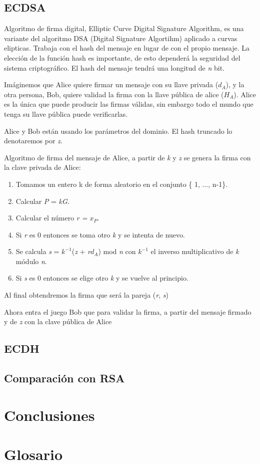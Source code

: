 \documentclass[11pt]{article}
\begin{document}
\subsection{ECDSA}

Algoritmo de firma digital, Elliptic Curve Digital Signature Algorithm, es una variante del algoritmo DSA (Digital Signature Algortihm) aplicado a curvas elipticas. Trabaja con el hash del mensaje en lugar de con el propio mensaje. La elección de la función hash es importante, de esto dependerá la seguridad del sistema criptográfico. El hash del mensaje tendrá una longitud de \textit{n} bit.

Imáginemos que Alice quiere firmar un mensaje con su llave privada ($d_{A}$), y la otra persona, Bob, quiere validad la firma con la llave pública de alice ($H_{A}$). Alice es la única que puede producir las firmas válidas, sin embargo todo el mundo que tenga su llave pública puede verificarlas.

Alice y Bob están usando los parámetros del dominio. El hash truncado lo denotaremos por \textit{z}.

Algoritmo de firma del mensaje de Alice, a partir de \textit{k} y \textit{z} se genera la firma con la clave privada de Alice:


\begin{enumerate}
	\item Tomamos un entero k de forma aleatorio en el conjunto \{ 1, ..., n-1\}.
	\item Calcular \textit{P} = \textit{kG}.
	\item Calcular el número \textit{r = $x_{P}$}.
	\item Si \textit{r} es 0 entonces se toma otro \textit{k} y se intenta de nuevo.
	\item Se calcula \textit{s} = \textit{$k^{-1}$}(\textit{z} + \textit{r$d_{A}$}) mod \textit{n}  con \textit{$k^{-1}$} el inverso multiplicativo de \textit{k} módulo \textit{n}.
	\item Si \textit{s} es 0 entonces se elige otro \textit{k} y se vuelve al principio.
\end{enumerate} 

Al final obtendremos la firma que será la pareja (\textit{r}, \textit{s}) 

Ahora entra el juego Bob que para validar la firma, a partir del mensaje firmado y de \textit{z} con la clave pública de Alice


\subsection{ECDH}

\subsection{Comparación con RSA}

\section{Conclusiones}




\appendix
\renewcommand{\thesection}{\Roman{section}}
\setcounter{section}{0}
\section{Glosario}
\end{document}
